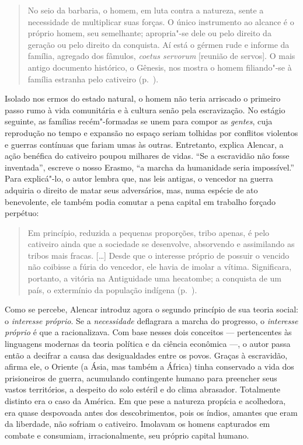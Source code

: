\begin{quote}
No seio da barbaria, o homem, em luta contra a natureza, sente a
necessidade de multiplicar suas forças. O único instrumento ao alcance
é o próprio homem, seu semelhante; apropria"-se dele ou pelo direito
da geração ou pelo direito da conquista. Aí está o gérmen rude e
informe da família, agregado dos fâmulos, \textit{coetus servorum}
[reunião de servos]. O mais antigo documento histórico, o Gênesis, nos
mostra o homem filiando"-se à  família estranha pelo cativeiro
(p.~\pageref{barbaria}). 
\end{quote}

Isolado nos ermos do estado natural, o homem não teria arriscado o
primeiro passo rumo à  vida comunitária e à  cultura senão pela
escravização. No estágio seguinte, as famílias recém"-formadas se unem
para compor as \textit{gentes}, cuja reprodução no tempo e expansão no
espaço seriam tolhidas por conflitos violentos e guerras contínuas que
fariam umas às outras. Entretanto, explica Alencar, a ação benéfica do
cativeiro poupou milhares de vidas. ``Se a escravidão não fosse
inventada'', escreve o nosso Erasmo, ``a marcha da humanidade seria
impossível.'' Para explicá"-lo, o autor lembra que, nas leis antigas, o
vencedor na guerra adquiria o direito de matar seus adversários, mas,
numa espécie de ato benevolente, ele também podia comutar a pena
capital em trabalho forçado perpétuo: 

\begin{quote}
Em princípio, reduzida a pequenas proporções, tribo apenas, é pelo
cativeiro ainda que a sociedade se desenvolve, absorvendo e assimilando
as tribos mais fracas. [\ldots] 
Desde que o interesse próprio de possuir o vencido não coibisse a fúria
do vencedor, ele havia de imolar a vítima. Significara, portanto, a
vitória na Antiguidade uma hecatombe; a conquista de um país, o
extermínio da população indígena (p.~\pageref{hecatombe}). 
\end{quote}

Como se percebe, Alencar introduz agora o segundo princípio de sua
teoria social: o \textit{interesse próprio}. Se a \textit{necessidade}
deflagrara a marcha do progresso, o \textit{interesse próprio} é que a
racionalizava. Com base nesses dois conceitos --- pertencentes às
linguagens modernas da teoria política e da ciência econômica ---, o
autor passa então a decifrar a causa das desigualdades entre os povos.
Graças à  escravidão, afirma ele, o Oriente (a Ásia, mas também a
África) tinha conservado a vida dos prisioneiros de guerra, acumulando
contingente humano para preencher seus vastos territórios, a despeito
do solo estéril e do clima abrasador. Totalmente distinto era o caso da
América. Em que pese a natureza propícia e acolhedora, era quase
despovoada antes dos descobrimentos, pois os índios, amantes que eram
da liberdade, não sofriam o cativeiro. Imolavam os homens capturados em
combate e consumiam, irracionalmente, seu próprio capital humano. 


